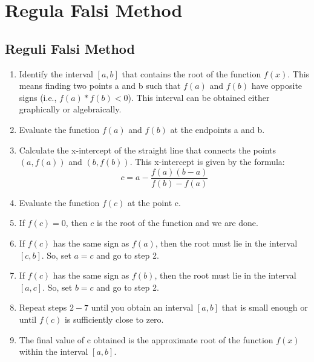 \newpage
\chapter{Regula Falsi Method}



\section{Reguli Falsi Method}

\begin{enumerate}
  \item Identify the interval $[a,b]$ that contains the root of the function $f(x)$. This means finding two points a and b such that $f(a)$ and $f(b)$ have opposite signs (i.e., $f(a) * f(b) < 0$). This interval can be obtained either graphically or algebraically.

  \item Evaluate the function $f(a)$ and $f(b)$ at the endpoints a and b.
  
  \item Calculate the x-intercept of the straight line that connects the points $(a, f(a))$ and $(b, f(b))$. This x-intercept is given by the formula:
  \begin{equation*}
    c = a - \frac{f(a)(b - a)}{f(b) - f(a)}
  \end{equation*}
  
  \item Evaluate the function $f(c)$ at the point c.
  
  \item If $f(c) = 0$, then $c$ is the root of the function and we are done.
  
  \item If $f(c)$ has the same sign as $f(a)$, then the root must lie in the interval $[c,b]$. So, set $a = c$ and go to step 2.
  
  \item If $f(c)$ has the same sign as $f(b)$, then the root must lie in the interval $[a,c]$. So, set $b = c$ and go to step 2.
  
  \item Repeat steps $2-7$ until you obtain an interval $[a,b]$ that is small enough or until $f(c)$ is sufficiently close to zero.
  
  \item The final value of c obtained is the approximate root of the function $f(x)$ within the interval $[a,b]$.
  


\end{enumerate}
